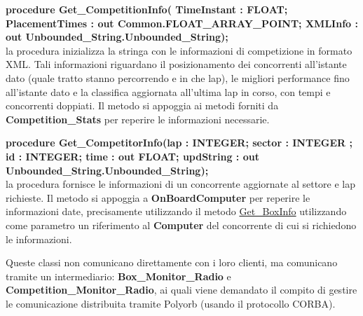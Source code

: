 \begin{description}
\item{\textbf{procedure Get\_CompetitionInfo( TimeInstant : FLOAT; PlacementTimes : out Common.FLOAT\_ARRAY\_POINT; XMLInfo : out Unbounded\_String.Unbounded\_String);}}\\
la procedura inizializza la stringa con le informazioni di competizione in formato XML. Tali informazioni riguardano il posizionamento
dei concorrenti all'istante dato (quale tratto stanno percorrendo e in che lap), le migliori performance fino all'istante dato e la classifica
aggiornata all'ultima lap in corso, con tempi e concorrenti doppiati. Il metodo si appoggia ai metodi forniti da \textbf{Competition\_Stats}
per reperire le informazioni necessarie.
\item{\textbf{procedure Get\_CompetitorInfo(lap : INTEGER; sector : INTEGER ; id : INTEGER; time : out FLOAT; updString : out Unbounded\_String.Unbounded\_String);}}\\
la procedura fornisce le informazioni di un concorrente aggiornate al settore e lap richieste. Il metodo si appoggia a \textbf{OnBoardComputer}
per reperire le informazioni date, precisamente utilizzando il metodo \underline{Get\_BoxInfo} utilizzando come parametro un riferimento
al \textbf{Computer} del concorrente di cui si richiedono le informazioni.
\end{description}
Queste classi non comunicano direttamente con i loro clienti, ma comunicano tramite un intermediario: \textbf{Box\_Monitor\_Radio} e 
\textbf{Competition\_Monitor\_Radio}, ai quali viene demandato il compito di gestire le comunicazione distribuita tramite Polyorb (usando
il protocollo CORBA).
\newpage
